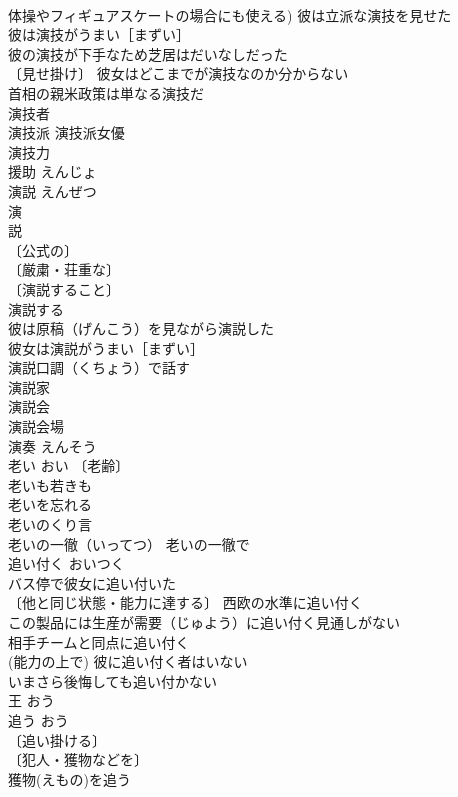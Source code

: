 \documentclass[8pt]{extreport}
\begin{document}
\begin{CJK}{UTF8}{min}
\\	体操やフィギュアスケートの場合にも使える) 彼は立派な演技を見せた 
\\	彼は演技がうまい［まずい］ 
\\	彼の演技が下手なため芝居はだいなしだった 
\\	〔見せ掛け〕 彼女はどこまでが演技なのか分からない 
\\	首相の親米政策は単なる演技だ 
\\	演技者 
\\	演技派 演技派女優 
\\	演技力 
\\	援助	えんじょ	
\\	演説	えんぜつ	
\\	演 
\\	説 
\\	〔公式の〕
\\	〔厳粛・荘重な〕
\\	〔演説すること〕
\\	演説する 
\\	彼は原稿（げんこう）を見ながら演説した 
\\	彼女は演説がうまい［まずい］ 
\\	演説口調（くちょう）で話す 
\\	演説家 
\\	演説会 
\\	演説会場 
\\	演奏	えんそう	
\\	老い	おい	〔老齢〕
\\	老いも若きも 
\\	老いを忘れる 
\\	老いのくり言 
\\	老いの一徹（いってつ） 老いの一徹で 
\\	追い付く	おいつく	
\\	バス停で彼女に追い付いた 
\\	〔他と同じ状態・能力に達する〕 西欧の水準に追い付く 
\\	この製品には生産が需要（じゅよう）に追い付く見通しがない 
\\	相手チームと同点に追い付く 
\\	(能力の上で) 彼に追い付く者はいない 
\\	いまさら後悔しても追い付かない 
\\	王	おう	
\\	追う	おう	
\\	〔追い掛ける〕
\\	〔犯人・獲物などを〕
\\	獲物(えもの)を追う 

\end{CJK}
\end{document}
